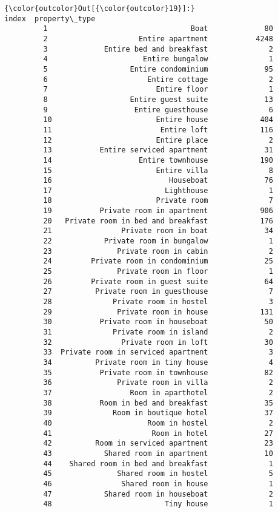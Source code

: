 \documentclass[11pt]{article}
\begin{document}
\begin{Verbatim}[commandchars=\\\{\}]
{\color{outcolor}Out[{\color{outcolor}19}]:}                                  index  property\_type
         1                                 Boat             80
         2                     Entire apartment           4248
         3             Entire bed and breakfast              2
         4                      Entire bungalow              1
         5                   Entire condominium             95
         6                       Entire cottage              2
         7                         Entire floor              1
         8                   Entire guest suite             13
         9                    Entire guesthouse              6
         10                        Entire house            404
         11                         Entire loft            116
         12                        Entire place              2
         13           Entire serviced apartment             31
         14                    Entire townhouse            190
         15                        Entire villa              8
         16                           Houseboat             76
         17                          Lighthouse              1
         18                        Private room              7
         19           Private room in apartment            906
         20   Private room in bed and breakfast            176
         21                Private room in boat             34
         22            Private room in bungalow              1
         23               Private room in cabin              2
         24         Private room in condominium             25
         25               Private room in floor              1
         26         Private room in guest suite             64
         27          Private room in guesthouse              7
         28              Private room in hostel              3
         29               Private room in house            131
         30           Private room in houseboat             50
         31              Private room in island              2
         32                Private room in loft             30
         33  Private room in serviced apartment              3
         34          Private room in tiny house              4
         35           Private room in townhouse             82
         36               Private room in villa              2
         37                  Room in aparthotel              2
         38           Room in bed and breakfast             35
         39              Room in boutique hotel             37
         40                      Room in hostel              2
         41                       Room in hotel             27
         42          Room in serviced apartment             23
         43            Shared room in apartment             10
         44    Shared room in bed and breakfast              1
         45               Shared room in hostel              5
         46                Shared room in house              1
         47            Shared room in houseboat              2
         48                          Tiny house              1
\end{Verbatim}
            
\end{document}
